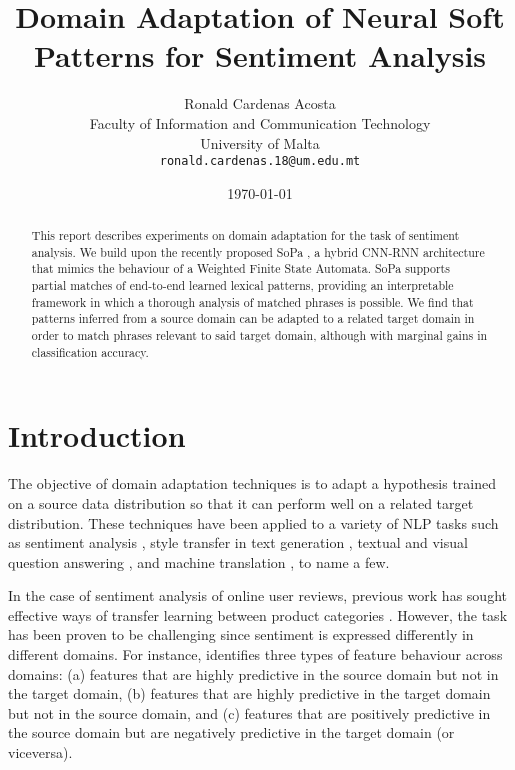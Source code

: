 \documentclass[11pt,a4paper]{article}
\title{Domain Adaptation of Neural Soft Patterns for Sentiment Analysis}
\author{Ronald Cardenas Acosta\\
  Faculty of Information and Communication Technology \\
  University of Malta \\
  {\tt ronald.cardenas.18@um.edu.mt} \\}
\date{\today}
\begin{document}
\maketitle
\begin{abstract}
  This report describes experiments on domain adaptation for the task of sentiment analysis.
  We build upon the recently proposed {\sc SoPa} \cite{schwartz2018sopa}, a hybrid CNN-RNN architecture that mimics the behaviour of a Weighted Finite State Automata.
  {\sc SoPa} supports partial matches of end-to-end learned lexical patterns, providing an interpretable framework in which a thorough analysis of matched phrases is possible.
  We find that patterns inferred from a source domain can be adapted to a related target domain in order to match phrases relevant to said target domain, although with marginal gains in classification accuracy.
\end{abstract}


\section{Introduction}


The objective of domain adaptation techniques is to adapt a hypothesis trained on a source data distribution so that it can perform well on a related target distribution.
These techniques have been applied to a variety of NLP tasks such as sentiment analysis \cite{blitzer2007biographies,mcauley2013hidden,mcauley2015image,ruder2018strong}, style transfer in text generation \cite{fu2018style,NIPS2018_7959,peng-etal-2018-towards}, textual and visual question answering \cite{chao2018cross,zhao2018finding}, and machine translation \cite{etchegoyhen2018evaluating,britz2017effective}, to name a few.

In the case of sentiment analysis of online user reviews, previous work has sought effective ways of transfer learning between product categories \cite{blitzer2007biographies,ruder2018strong}. However, the task has been proven to be challenging since sentiment is expressed differently in different domains.
For instance, \citet{blitzer2007biographies} identifies three types of feature behaviour across domains: (a) features that are highly predictive in the source domain but not in the target domain, (b) features that are highly predictive in the target domain but not in the source domain, and (c) features that are positively predictive in the source domain but are negatively predictive in the target domain (or viceversa).
\end{document}
